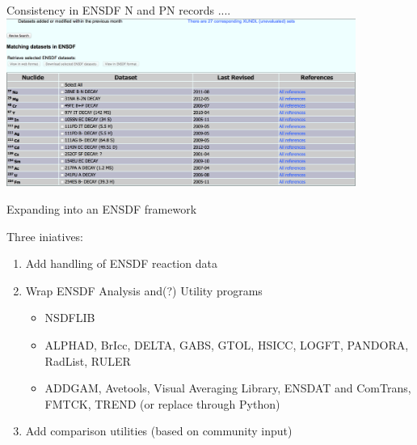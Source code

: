 \documentclass[xcolor=x11names,compress]{beamer}
\renewcommand{\(}{\begin{columns}}
\renewcommand{\)}{\end{columns}}
\newcommand{\<}[1]{\begin{column}{#1}}
\renewcommand{\>}{\end{column}}
\begin{document}
\begin{frame}{Consistency in ENSDF N and PN records ....}
    \includegraphics[height=5.5cm]{ensdf_updates}
\end{frame}
\begin{frame}{Expanding into an ENSDF framework}

    Three iniatives:
    \begin{enumerate}
        \item Add handling of ENSDF \alert{reaction} data
        
        \item Wrap ENSDF \alert{Analysis} and(?) \alert{Utility} programs
        \begin{itemize}
            \item NSDFLIB
            \item ALPHAD, BrIcc, DELTA, GABS, GTOL, HSICC, LOGFT,
            PANDORA, RadList, RULER
            \item ADDGAM, Avetools, Visual Averaging Library, ENSDAT 
            and ComTrans, FMTCK, TREND (or replace through Python)
        \end{itemize}
        
        \item Add comparison utilities (based on \alert{community input})
    \end{enumerate}
    
\end{frame}

\end{document}
